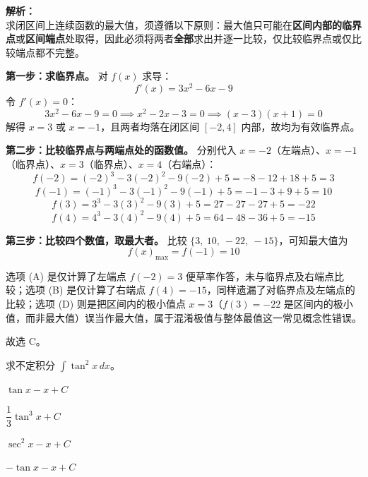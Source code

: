 \documentclass[12pt,a4paper]{exam-zh}
\begin{document}
\begin{solution}
    \textbf{解析：} \\
    求闭区间上连续函数的最大值，须遵循以下原则：最大值只可能在\textbf{区间内部的临界点}或\textbf{区间端点}处取得，因此必须将两者\textbf{全部}求出并逐一比较，仅比较临界点或仅比较端点都不完整。

    \textbf{第一步：求临界点。} 对 $f(x)$ 求导：
    \[ \displaystyle f'(x) = 3x^2 - 6x - 9 \]
    令 $f'(x) = 0$：
    \[ \displaystyle 3x^2 - 6x - 9 = 0 \implies x^2 - 2x - 3 = 0 \implies (x-3)(x+1) = 0 \]
    解得 $x = 3$ 或 $x = -1$，且两者均落在闭区间 $[-2, 4]$ 内部，故均为有效临界点。

    \textbf{第二步：比较临界点与两端点处的函数值。} 分别代入 $x=-2$（左端点）、$x=-1$（临界点）、$x=3$（临界点）、$x=4$（右端点）：
    \[ \displaystyle f(-2) = (-2)^3 - 3(-2)^2 - 9(-2) + 5 = -8 - 12 + 18 + 5 = 3 \]
    \[ \displaystyle f(-1) = (-1)^3 - 3(-1)^2 - 9(-1) + 5 = -1 - 3 + 9 + 5 = 10 \]
    \[ \displaystyle f(3) = 3^3 - 3(3)^2 - 9(3) + 5 = 27 - 27 - 27 + 5 = -22 \]
    \[ \displaystyle f(4) = 4^3 - 3(4)^2 - 9(4) + 5 = 64 - 48 - 36 + 5 = -15 \]

    \textbf{第三步：比较四个数值，取最大者。} 比较 $\{3,\ 10,\ -22,\ -15\}$，可知最大值为
    \[ \displaystyle f(x)_{\max} = f(-1) = 10 \]

    选项 (A) 是仅计算了左端点 $f(-2)=3$ 便草率作答，未与临界点及右端点比较；选项 (B) 是仅计算了右端点 $f(4)=-15$，同样遗漏了对临界点及左端点的比较；选项 (D) 则是把区间内的极小值点 $x=3$（$f(3)=-22$ 是区间内的极小值，而非最大值）误当作最大值，属于混淆极值与整体最值这一常见概念性错误。

    故选 C。
\end{solution}

\begin{question}
    求不定积分 $\displaystyle\int \tan^2 x\,dx$。\paren[A]
    \begin{choices}
        \item $\tan x - x + C$
        \item $\dfrac{1}{3}\tan^3 x + C$
        \item $\sec^2 x - x + C$
        \item $-\tan x - x + C$
    \end{choices}
\end{question}
\end{document}
